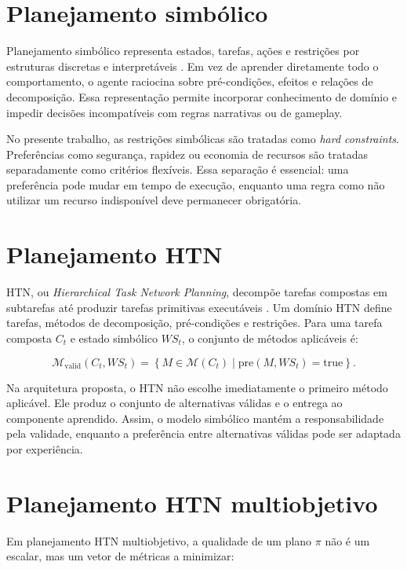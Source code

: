 \section{Planejamento simbólico}

Planejamento simbólico representa estados, tarefas, ações e restrições por
estruturas discretas e interpretáveis \cite{ghallab2004}.
Em vez de aprender diretamente todo o comportamento, o agente raciocina sobre
pré-condições, efeitos e relações de decomposição.
Essa representação permite incorporar conhecimento de domínio e impedir
decisões incompatíveis com regras narrativas ou de gameplay.

No presente trabalho, as restrições simbólicas são tratadas como
\textit{hard constraints}.
Preferências como segurança, rapidez ou economia de recursos são tratadas
separadamente como critérios flexíveis.
Essa separação é essencial: uma preferência pode mudar em tempo de execução,
enquanto uma regra como não utilizar um recurso indisponível deve permanecer
obrigatória.

\section{Planejamento HTN}

HTN, ou \textit{Hierarchical Task Network Planning}, decompõe tarefas
compostas em subtarefas até produzir tarefas primitivas executáveis
\cite{erol1994,georgievski2014,nau2003shop2}.
Um domínio HTN define tarefas, métodos de decomposição, pré-condições
e restrições.
Para uma tarefa composta $C_t$ e estado simbólico $WS_t$, o conjunto de métodos
aplicáveis é:

\begin{equation}
\mathcal{M}_{\mathrm{valid}}(C_t,WS_t)
=
\left\{M \in \mathcal{M}(C_t) \mid \mathrm{pre}(M,WS_t)=\mathrm{true}\right\}.
\end{equation}

Na arquitetura proposta, o HTN não escolhe imediatamente o primeiro método
aplicável.
Ele produz o conjunto de alternativas válidas e o entrega ao componente
aprendido.
Assim, o modelo simbólico mantém a responsabilidade pela validade, enquanto
a preferência entre alternativas válidas pode ser adaptada por experiência.

\section{Planejamento HTN multiobjetivo}

Em planejamento HTN multiobjetivo, a qualidade de um plano $\pi$ não é um
escalar, mas um vetor de métricas a minimizar:

